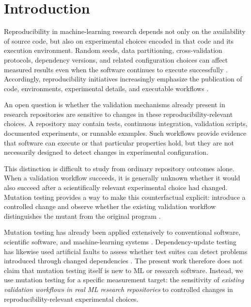 \section{Introduction}
\label{sec:introduction}

Reproducibility in machine-learning research depends not only on the
availability of source code, but also on experimental choices encoded in that
code and its execution environment. Random seeds, data partitioning,
cross-validation protocols, dependency versions, and related configuration
choices can affect measured results even when the software continues to execute
successfully \cite{reimers2017score,henderson2018matters,bouthillier2021variance}.
Accordingly, reproducibility initiatives increasingly emphasize the
publication of code, environments, experimental details, and executable
workflows \cite{gundersen2018reproducibility,pineau2021improving,heil2021standards}.

An open question is whether the validation mechanisms already present in
research repositories are sensitive to changes in these
reproducibility-relevant choices. A repository may contain tests, continuous
integration, validation scripts, documented experiments, or runnable examples.
Such workflows provide evidence that software can execute or that particular
properties hold, but they are not necessarily designed to detect changes in
experimental configuration.

This distinction is difficult to study from ordinary repository outcomes
alone. When a validation workflow succeeds, it is generally unknown whether it
would also succeed after a scientifically relevant experimental choice had
changed. Mutation testing provides a way to make this counterfactual explicit:
introduce a controlled change and observe whether the existing validation
workflow distinguishes the mutant from the original program
\cite{jia2011mutation,just2014mutants}.

Mutation testing has already been applied extensively to conventional software,
scientific software, and machine-learning systems
\cite{hook2009trustworthiness,ma2018deepmutation,humbatova2021deepcrime}.
Dependency-update testing has likewise used artificial faults to assess whether
test suites can detect problems introduced through changed dependencies
\cite{hejderup2022dependencies}. The present work therefore does not claim that
mutation testing itself is new to ML or research software. Instead, we use
mutation testing for a specific measurement target: the sensitivity of
\emph{existing validation workflows in real ML research repositories} to
controlled changes in reproducibility-relevant experimental choices.

